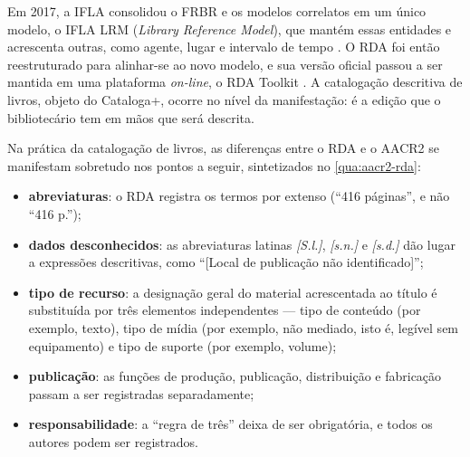 Em 2017, a IFLA consolidou o FRBR e os modelos correlatos em um único modelo, o IFLA LRM (\textit{Library Reference Model}), que mantém essas entidades e acrescenta outras, como agente, lugar e intervalo de tempo \cite{riva2017lrm}. O RDA foi então reestruturado para alinhar-se ao novo modelo, e sua versão oficial passou a ser mantida em uma plataforma \textit{on-line}, o RDA Toolkit \cite{rdatoolkit}. A catalogação descritiva de livros, objeto do Cataloga+, ocorre no nível da manifestação: é a edição que o bibliotecário tem em mãos que será descrita.

Na prática da catalogação de livros, as diferenças entre o RDA e o AACR2 se manifestam sobretudo nos pontos a seguir, sintetizados no \autoref{qua:aacr2-rda}:

\begin{itemize}
    \item \textbf{abreviaturas}: o RDA registra os termos por extenso (``416 páginas'', e não ``416 p.'');
    \item \textbf{dados desconhecidos}: as abreviaturas latinas \textit{[S.l.]}, \textit{[s.n.]} e \textit{[s.d.]} dão lugar a expressões descritivas, como ``[Local de publicação não identificado]'';
    \item \textbf{tipo de recurso}: a designação geral do material acrescentada ao título é substituída por três elementos independentes --- tipo de conteúdo (por exemplo, texto), tipo de mídia (por exemplo, não mediado, isto é, legível sem equipamento) e tipo de suporte (por exemplo, volume);
    \item \textbf{publicação}: as funções de produção, publicação, distribuição e fabricação passam a ser registradas separadamente;
    \item \textbf{responsabilidade}: a ``regra de três'' deixa de ser obrigatória, e todos os autores podem ser registrados.
\end{itemize}

